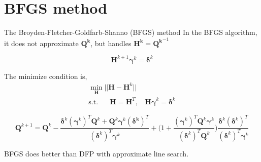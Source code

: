 \documentclass{beamer}
\begin{document}
\section{BFGS method}
\begin{frame}{The Broyden-Fletcher-Goldfarb-Shanno (BFGS) method}
In the BFGS algorithm, it does not approximate $\boldsymbol{Q^k}$, but handles $\boldsymbol{H^k} = \boldsymbol{Q^k}^{-1}$

\begin{equation*}
    \boldsymbol{H}^{k+1}\boldsymbol{\gamma}^{k} = \boldsymbol{\delta}^{k}    
\end{equation*}

The minimize condition is,
\begin{gather*}
    \underset{\boldsymbol{H}}{\min} ||\boldsymbol{H} - \boldsymbol{H}^{k}|| \\
		{\textrm{s.t.~~~~~}} \boldsymbol{H} = \boldsymbol{H}^T,~~~~    \boldsymbol{H \gamma}^k = \boldsymbol{\delta}^k
\end{gather*}

\begin{equation*}
    \boldsymbol{Q}^{k+1} = \boldsymbol{Q}^k - 
    \frac{\boldsymbol{\delta}^k (\boldsymbol{\gamma}^k)^T \boldsymbol{Q}^k + \boldsymbol{Q}^k\boldsymbol{\gamma}^k (\boldsymbol{\delta^k})^T}
    {(\boldsymbol{\delta}^k)^T \boldsymbol{\gamma}^k} 
    + \bigg(1 + \frac{(\boldsymbol{\gamma}^k)^T \boldsymbol{Q}^k \boldsymbol{\gamma}^k}{(\boldsymbol{\delta}^k)^T \boldsymbol{Q}^k}\bigg)
    \frac{\boldsymbol{\delta}^k (\boldsymbol{\delta}^k)^T}{(\boldsymbol{\delta}^k)^T \boldsymbol{\gamma}^k}
    
\end{equation*}


BFGS does better than DFP with approximate line search. 
\end{frame}
\end{document}
